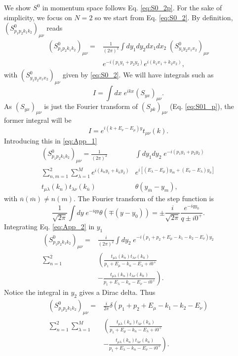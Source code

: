 \documentclass[notitlepage, prx, preprint, amsmath,superscriptaddress,amssymb]{revtex4-1}
\begin{document}
We show $S^0$ in momentum space follows Eq. \eqref{eq:S0_2p}. For the sake of simplicity, we focus on $N=2$ so we start from Eq. \eqref{eq:S0_2}. By definition, $(S^0_{p_1p_2k_1k_2})_{\mu\nu}$ reads
\begin{align}\label{eq:App_1}
(S_{p_1p_2k_1k_2}^0)_{\mu\nu}=&\frac{1}{(2\pi)^2}\int  dy_1dy_2dx_1dx_2\; (S_{y_1y_2x_1x_2}^0)_{\mu\nu}\nonumber\\
& e^{-i(p_1y_1+p_2y_2)}  e^{i(k_1x_1+k_2x_2)},
\end{align}
with $(S_{y_1y_2x_1x_2}^0)_{\mu\nu}$ given by \eqref{eq:S0_2}. We will have integrals such as
\begin{equation}
I=\int dx\; e^{ikx}(S_{yx})_{\mu\nu}.
\end{equation}
As $(S_{yx})_{\mu\nu}$ is just the Fourier transform of $(S_{pk})_{\mu\nu}$ (Eq. \eqref{eq:S01_p}), the former integral will be
\begin{equation}
I=e^{i(k+E_\nu-E_\mu)y}t_{\mu\nu}(k).
\end{equation}
Introducing this in \eqref{eq:App_1}
\begin{align}\label{eq:App_2}
(S_{p_1p_2k_1k_2}^0)_{\mu\nu}=\frac{1}{(2\pi)^2} &\int dy_1 dy_2\; e^{-i(p_1y_1+p_2y_2)}\nonumber\\
\sum_{n,m=1}^2 \sum_{\lambda=1}^M e^{i(k_ny_1 + k_{\overline{n}} y_2)}& e^{i[(E_\lambda-E_\mu)y_m+(E_\nu-E_\lambda)y_{\overline{n}}]} \nonumber\\
t_{\mu\lambda}(k_n)t_{\lambda\nu}(k_{\overline{n}})& \theta(y_{\overline{m}}-y_m),
\end{align}
with $\overline{n}(\overline{m})\neq n(m)$. The Fourier transform of the step function is
\begin{equation}
\frac{1}{\sqrt{2\pi}}\int dy \; e^{-iqy}\theta(\mp(y-y_0))=\pm\frac{i}{\sqrt{2\pi}}\frac{e^{-iqy_0}}{q\pm i0^+}.
\end{equation}
Integrating Eq. \eqref{eq:App_2} in $y_1$
\begin{align}
(S_{p_1p_2k_1k_2}^0)_{\mu\nu}=&\frac{i}{(2\pi)^2} \int dy_2\; e^{-i(p_1+p_2+E_\mu-k_1-k_2-E_\nu)y_2} \nonumber\\
\sum_{n=1}^2 & \left( \frac{t_{\mu\lambda}(k_n)t_{\lambda\nu}(k_{\overline{n}})}{p_1+E_\mu-k_n-E_\lambda+i0^+} \right. \nonumber\\
&\left. -\frac{t_{\mu\lambda}(k_n)t_{\lambda\nu}(k_{\overline{n}})}{p_1+E_\lambda-k_n-E_\nu-i0^+}\right).
\end{align}
Notice the integral in $y_2$ gives a Dirac delta. Thus
\begin{align}
(S_{p_1p_2k_1k_2}^0)_{\mu\nu}=&\frac{i}{2\pi} \delta(p_1+p_2+E_\mu-k_1-k_2-E_\nu) \nonumber\\
\sum_{n=1}^2 \sum_{\lambda=1}^M& \left( \frac{t_{\mu\lambda}(k_n)t_{\lambda\nu}(k_{\overline{n}})}{p_1+E_\mu-k_n-E_\lambda+i0^+} \right. \nonumber\\
&\left. -\frac{t_{\mu\lambda}(k_n)t_{\lambda\nu}(k_{\overline{n}})}{p_1+E_\lambda-k_n-E_\nu-i0^+}\right).
\end{align}
\end{document}
